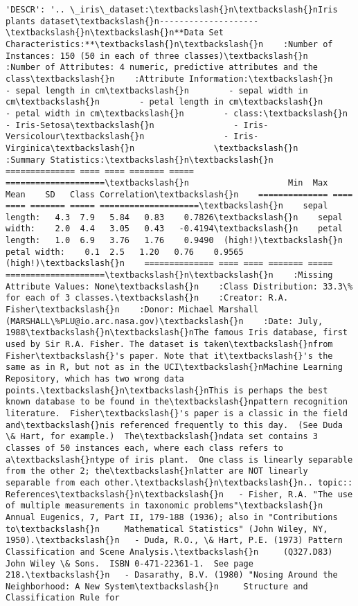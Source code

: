 \documentclass[11pt]{article}
\begin{document}
\begin{Verbatim}[commandchars=\\\{\}]
          'DESCR': '.. \_iris\_dataset:\textbackslash{}n\textbackslash{}nIris plants dataset\textbackslash{}n--------------------\textbackslash{}n\textbackslash{}n**Data Set Characteristics:**\textbackslash{}n\textbackslash{}n    :Number of Instances: 150 (50 in each of three classes)\textbackslash{}n    :Number of Attributes: 4 numeric, predictive attributes and the class\textbackslash{}n    :Attribute Information:\textbackslash{}n        - sepal length in cm\textbackslash{}n        - sepal width in cm\textbackslash{}n        - petal length in cm\textbackslash{}n        - petal width in cm\textbackslash{}n        - class:\textbackslash{}n                - Iris-Setosa\textbackslash{}n                - Iris-Versicolour\textbackslash{}n                - Iris-Virginica\textbackslash{}n                \textbackslash{}n    :Summary Statistics:\textbackslash{}n\textbackslash{}n    ============== ==== ==== ======= ===== ====================\textbackslash{}n                    Min  Max   Mean    SD   Class Correlation\textbackslash{}n    ============== ==== ==== ======= ===== ====================\textbackslash{}n    sepal length:   4.3  7.9   5.84   0.83    0.7826\textbackslash{}n    sepal width:    2.0  4.4   3.05   0.43   -0.4194\textbackslash{}n    petal length:   1.0  6.9   3.76   1.76    0.9490  (high!)\textbackslash{}n    petal width:    0.1  2.5   1.20   0.76    0.9565  (high!)\textbackslash{}n    ============== ==== ==== ======= ===== ====================\textbackslash{}n\textbackslash{}n    :Missing Attribute Values: None\textbackslash{}n    :Class Distribution: 33.3\% for each of 3 classes.\textbackslash{}n    :Creator: R.A. Fisher\textbackslash{}n    :Donor: Michael Marshall (MARSHALL\%PLU@io.arc.nasa.gov)\textbackslash{}n    :Date: July, 1988\textbackslash{}n\textbackslash{}nThe famous Iris database, first used by Sir R.A. Fisher. The dataset is taken\textbackslash{}nfrom Fisher\textbackslash{}'s paper. Note that it\textbackslash{}'s the same as in R, but not as in the UCI\textbackslash{}nMachine Learning Repository, which has two wrong data points.\textbackslash{}n\textbackslash{}nThis is perhaps the best known database to be found in the\textbackslash{}npattern recognition literature.  Fisher\textbackslash{}'s paper is a classic in the field and\textbackslash{}nis referenced frequently to this day.  (See Duda \& Hart, for example.)  The\textbackslash{}ndata set contains 3 classes of 50 instances each, where each class refers to a\textbackslash{}ntype of iris plant.  One class is linearly separable from the other 2; the\textbackslash{}nlatter are NOT linearly separable from each other.\textbackslash{}n\textbackslash{}n.. topic:: References\textbackslash{}n\textbackslash{}n   - Fisher, R.A. "The use of multiple measurements in taxonomic problems"\textbackslash{}n     Annual Eugenics, 7, Part II, 179-188 (1936); also in "Contributions to\textbackslash{}n     Mathematical Statistics" (John Wiley, NY, 1950).\textbackslash{}n   - Duda, R.O., \& Hart, P.E. (1973) Pattern Classification and Scene Analysis.\textbackslash{}n     (Q327.D83) John Wiley \& Sons.  ISBN 0-471-22361-1.  See page 218.\textbackslash{}n   - Dasarathy, B.V. (1980) "Nosing Around the Neighborhood: A New System\textbackslash{}n     Structure and Classification Rule for 
\end{Verbatim}
\end{document}
